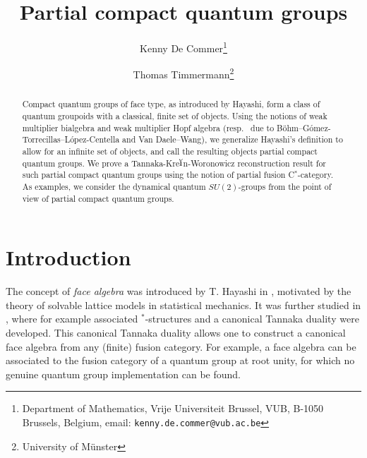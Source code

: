 \documentclass[10pt]{article}
\date{}
\theoremstyle{definition}
\numberwithin{equation}{section}
\begin{document}
\title{Partial compact quantum groups}

\author{Kenny De Commer\thanks{Department of Mathematics, Vrije Universiteit Brussel, VUB, B-1050 Brussels, Belgium, email: {\tt kenny.de.commer@vub.ac.be}}
\and Thomas Timmermann\thanks{University of M\"{u}nster}}

\maketitle

\begin{abstract}
\noindent Compact quantum groups of face type, as introduced by Hayashi, form a class of quantum groupoids with a classical, finite set of objects. Using the notions of weak multiplier bialgebra and weak multiplier Hopf algebra (resp.~ due to B{\"o}hm--G\'{o}mez-Torrecillas--L\'{o}pez-Centella and Van Daele--Wang), we generalize Hayashi's definition to allow for an infinite set of objects, and call the resulting objects partial compact quantum groups. We prove a Tannaka-Kre$\breve{\textrm{\i}}$n-Woronowicz reconstruction result for such partial compact quantum groups using the notion of partial fusion C$^*$-category. As examples, we consider the dynamical quantum $SU(2)$-groups from the point of view of partial compact quantum groups.
\end{abstract}









\section*{Introduction}

The concept of \emph{face algebra} was introduced by T. Hayashi in \cite{Hay2}, motivated by the theory of solvable lattice models in statistical mechanics. It was further studied in \cite{Hay1,Hay3,Hay4,Hay5,Hay6,Hay7,Hay8}, where for example associated $^*$-structures and a canonical Tannaka duality were developed. This canonical Tannaka duality allows one to construct a canonical face algebra from any (finite) fusion category. For example, a face algebra can be associated to the fusion category of a quantum group at root unity, for which no genuine quantum group implementation can be found. 
\end{document}
